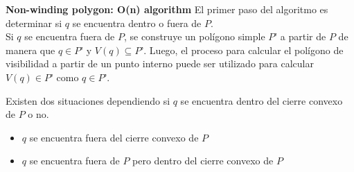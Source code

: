\documentclass[aspectratio=169,xcolor=dvipsnames, t]{beamer}
\begin{document}
\begin{frame}[c]
\textbf{Non-winding polygon: O(n) algorithm}
    \vspace{0.5cm}
    El primer paso del algoritmo es determinar si $q$ se encuentra dentro o fuera de $P$.\\
    \vspace{0.5cm}
    Si $q$ se encuentra fuera de $P$, se construye un polígono simple $P’$ a partir de $P$ de manera que $q \in P’$ y $V(q) \subseteq P’$. Luego, el proceso para calcular el polígono de visibilidad a partir de un punto interno puede ser utilizado para calcular $V(q) \in P’$ como  $q \in P’$.\\
\end{frame}


\begin{frame}[c]
    Existen dos situaciones dependiendo si $q$ se encuentra dentro del cierre convexo de $P$ o no.
    \begin{itemize}
        \item $q$ se encuentra fuera del cierre convexo de  $P$
        \item $q$ se encuentra fuera de $P$ pero dentro del cierre convexo de $P$
    \end{itemize}
\end{frame}
\end{document}
